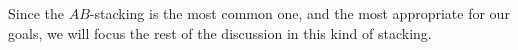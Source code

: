 


Since the $AB$-stacking is the most common one, and the most appropriate for our goals, we will focus the rest of the discussion in this kind of stacking.\\


